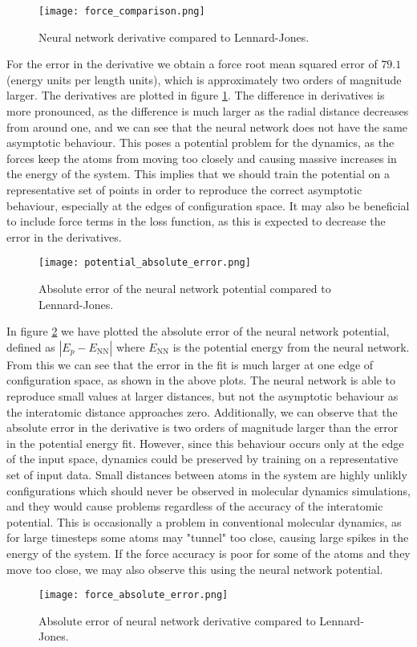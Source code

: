 \begin{figure}[H]
    \centering
    \texttt{[image: force\_comparison.png]}
    \caption{Neural network derivative compared to Lennard-Jones.}
    \label{fig:force-comparison}
\end{figure}

For the error in the derivative we obtain a force root mean squared error
of $79.1$ (energy units per length units), which is approximately two orders
of magnitude larger. The derivatives are plotted in figure
\ref{fig:force-comparison}.
The difference in derivatives is more pronounced, as the
difference is much larger as the radial distance decreases from
around one, and we can see that the neural network does not
have the same asymptotic behaviour. This poses a potential problem
for the dynamics, as the forces keep
the atoms from moving too closely and causing massive
increases in the energy of the system.
This implies that we should train the potential on a representative
set of points in order to reproduce the correct asymptotic behaviour,
especially at the edges of configuration space.
It may also be beneficial to include force terms in the loss function,
as this is expected to decrease the error in the derivatives.

\begin{figure}[H]
    \centering
    \texttt{[image: potential\_absolute\_error.png]}
    \caption{Absolute error of the neural network potential compared
        to Lennard-Jones.}
    \label{fig:potential-rel-error}
\end{figure}

In figure \ref{fig:potential-rel-error} we have plotted
the absolute error of the neural network potential, defined
as $\left| E_p - E_{\text{NN}}\right|$
where $E_{\text{NN}}$ is the potential energy from the neural network.
From this we can see that the error in the fit is much larger
at one edge of configuration space, as shown in the above plots.
The neural network is able to reproduce small values
at larger distances, but not the asymptotic behaviour
as the interatomic distance approaches zero.
Additionally, we can observe that the absolute error in the derivative
is two orders of magnitude larger than the error in the potential energy fit.
However, since
this behaviour occurs only at the edge of the input space,
dynamics could be preserved by training on a representative set
of input data. Small distances between atoms in the system are highly
unlikly configurations which
should never be observed in molecular dynamics simulations,
and they would cause problems regardless of the accuracy of the
interatomic potential. This is occasionally a problem in conventional
molecular dynamics, as for large timesteps some atoms may "tunnel"
too close, causing large spikes in the energy of the system.
If the force accuracy is poor for some of the atoms and they move too close,
we may also observe this using the neural network potential.

\begin{figure}[htb]
    \centering
    \texttt{[image: force\_absolute\_error.png]}
    \caption{Absolute error of neural network derivative compared
        to Lennard-Jones.}
    \label{fig:force-rel-error}
\end{figure}

